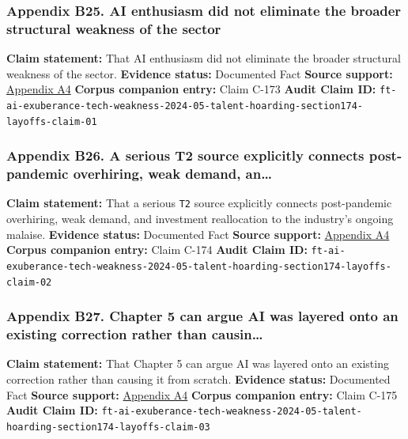 \documentclass[
  american,
  11pt,
  letterpaper,
]{article}
\begin{document}
\subsubsection{Appendix B25. AI enthusiasm did not eliminate the broader
structural weakness of the
sector}\label{ch-05-appendix-b25-ai-enthusiasm-did-not-eliminate-the-broader-structural-weakness-of-the-sector}

\textbf{Claim statement:} That AI enthusiasm did not eliminate the
broader structural weakness of the sector. \textbf{Evidence status:}
Documented Fact \textbf{Source support:}
\hyperref[ch-05-appendix-a4-ai-exuberance-masks-broad-weakness-in-tech-sector-say-investors]{Appendix
A4} \textbf{Corpus companion entry:} Claim C-173 \textbf{Audit Claim
ID:}
\texttt{ft-ai-exuberance-tech-weakness-2024-05-talent-hoarding-section174-layoffs-claim-01}

\subsubsection{Appendix B26. A serious T2 source explicitly connects
post-pandemic overhiring, weak demand,
an\ldots{}}\label{ch-05-appendix-b26-a-serious-t2-source-explicitly-connects-post-pandemic-overhiring-weak-demand-an}

\textbf{Claim statement:} That a serious \texttt{T2} source explicitly
connects post-pandemic overhiring, weak demand, and investment
reallocation to the industry's ongoing malaise. \textbf{Evidence
status:} Documented Fact \textbf{Source support:}
\hyperref[ch-05-appendix-a4-ai-exuberance-masks-broad-weakness-in-tech-sector-say-investors]{Appendix
A4} \textbf{Corpus companion entry:} Claim C-174 \textbf{Audit Claim
ID:}
\texttt{ft-ai-exuberance-tech-weakness-2024-05-talent-hoarding-section174-layoffs-claim-02}

\subsubsection{Appendix B27. Chapter 5 can argue AI was layered onto an
existing correction rather than
causin\ldots{}}\label{ch-05-appendix-b27-chapter-5-can-argue-ai-was-layered-onto-an-existing-correction-rather-than-causin}

\textbf{Claim statement:} That Chapter 5 can argue AI was layered onto
an existing correction rather than causing it from scratch.
\textbf{Evidence status:} Documented Fact \textbf{Source support:}
\hyperref[ch-05-appendix-a4-ai-exuberance-masks-broad-weakness-in-tech-sector-say-investors]{Appendix
A4} \textbf{Corpus companion entry:} Claim C-175 \textbf{Audit Claim
ID:}
\texttt{ft-ai-exuberance-tech-weakness-2024-05-talent-hoarding-section174-layoffs-claim-03}
\end{document}
